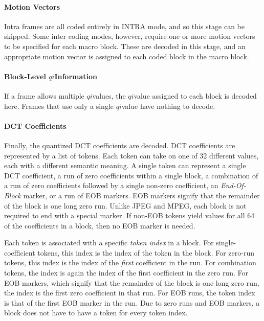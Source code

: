 \documentclass[11pt,letterpaper]{article}
\newcommand{\qi}{\ensuremath{\mathit{qi}}}
\newcommand{\term}[1]{{\em #1}}
\begin{document}
\paragraph{Motion Vectors}

Intra frames are all coded entirely in INTRA mode, and so this stage can be
 skipped.
Some inter coding modes, however, require one or more motion vectors to be
 specified for each macro block.
These are decoded in this stage, and an appropriate motion vector is assigned
 to each coded block in the macro block.

\paragraph{Block-Level \qi Information}

If a frame allows multiple \qi values, the \qi value assigned to each block is
 decoded here.
Frames that use only a single \qi value have nothing to decode.

\paragraph{DCT Coefficients}

Finally, the quantized DCT coefficients are decoded.
DCT coefficients are represented by a list of tokens.
Each token can take on one of 32 different values, each with a different
 semantic meaning.
A single token can represent a single DCT coefficient, a run of zero
 coefficients within a single block, a combination of a run of zero
 coefficients followed by a single non-zero coefficient, an
 \term{End-Of-Block} marker, or a run of EOB markers.
EOB markers signify that the remainder of the block is one long zero run.
Unlike JPEG and MPEG, each block is not required to end with a special marker.
If non-EOB tokens yield values for all 64 of the coefficients in a block, then
 no EOB marker is needed.

Each token is associated with a specific \term{token index} in a block.
For single-coefficient tokens, this index is the index of the token in the
 block.
For zero-run tokens, this index is the index of the {\em first} coefficient in
 the run.
For combination tokens, the index is again the index of the first coefficient
 in the zero run.
For EOB markers, which signify that the remainder of the block is one long zero
 run, the index is the first zero coefficient in that run.
For EOB runs, the token index is that of the first EOB marker in the run.
Due to zero runs and EOB markers, a block does not have to have a token for
 every token index.
\end{document}
